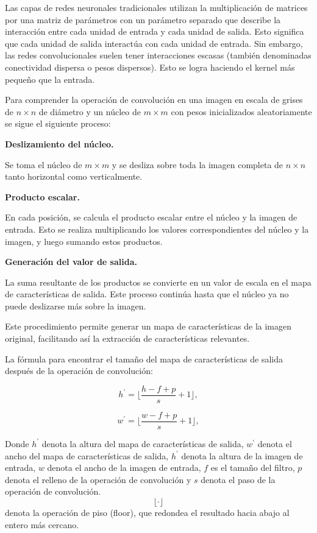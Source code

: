 \documentclass[
  us-letterpaper,
]{scrreprt}
\theoremstyle{plain}
\theoremstyle{definition}
\theoremstyle{definition}
\theoremstyle{remark}
\begin{document}
Las capas de redes neuronales tradicionales utilizan la multiplicación
de matrices por una matriz de parámetros con un parámetro separado que
describe la interacción entre cada unidad de entrada y cada unidad de
salida. Esto significa que cada unidad de salida interactúa con cada
unidad de entrada. Sin embargo, las redes convolucionales suelen tener
interacciones escasas (también denominadas conectividad dispersa o pesos
dispersos). Esto se logra haciendo el kernel más pequeño que la entrada.

Para comprender la operación de convolución en una imagen en escala de
grises de \(n \times  n\) de diámetro y un núcleo de \(m \times m\) con
pesos inicializados aleatoriamente se sigue el siguiente proceso:

\textbf{Deslizamiento del núcleo.}

Se toma el núcleo de \(m \times m\) y se desliza sobre toda la imagen
completa de \(n \times  n\) tanto horizontal como verticalmente.

\textbf{Producto escalar.}

En cada posición, se calcula el producto escalar entre el núcleo y la
imagen de entrada. Esto se realiza multiplicando los valores
correspondientes del núcleo y la imagen, y luego sumando estos
productos.

\textbf{Generación del valor de salida.}

La suma resultante de los productos se convierte en un valor de escala
en el mapa de características de salida. Este proceso continúa hasta que
el núcleo ya no puede deslizarse más sobre la imagen.

Este procedimiento permite generar un mapa de características de la
imagen original, facilitando así la extracción de características
relevantes.

La fórmula para encontrar el tamaño del mapa de características de
salida después de la operación de convolución:

\[  \displaystyle h^\prime = \lfloor  \dfrac{h-f+p}{s} +1 \rfloor ,\]

\[  \displaystyle w^\prime = \lfloor  \dfrac{w-f+p}{s} + 1 \rfloor, \]

Donde \(h^\prime\) denota la altura del mapa de características de
salida, \(w^\prime\) denota el ancho del mapa de características de
salida, \(h^\prime\) denota la altura de la imagen de entrada, \(w\)
denota el ancho de la imagen de entrada, \(f\) es el tamaño del filtro,
\(p\) denota el relleno de la operación de convolución y \(s\) denota el
paso de la operación de convolución. \[ \lfloor \cdot \rfloor \] denota
la operación de piso (floor), que redondea el resultado hacia abajo al
entero más cercano.
\end{document}
